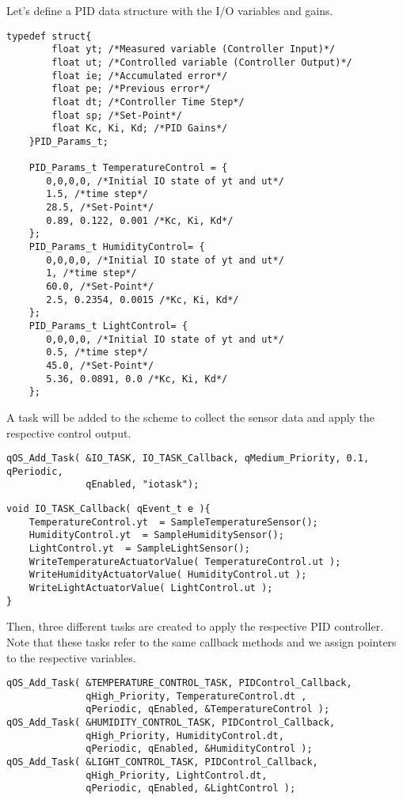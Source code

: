 Let's define a PID data structure with the I/O variables and gains. \\
 
\begin{lstlisting}[style=CStyle]
   typedef struct{
        float yt; /*Measured variable (Controller Input)*/
        float ut; /*Controlled variable (Controller Output)*/
        float ie; /*Accumulated error*/
        float pe; /*Previous error*/
        float dt; /*Controller Time Step*/
        float sp; /*Set-Point*/
        float Kc, Ki, Kd; /*PID Gains*/ 
    }PID_Params_t;
    
    PID_Params_t TemperatureControl = {
       0,0,0,0, /*Initial IO state of yt and ut*/
       1.5, /*time step*/
       28.5, /*Set-Point*/
       0.89, 0.122, 0.001 /*Kc, Ki, Kd*/
    };
    PID_Params_t HumidityControl= {
       0,0,0,0, /*Initial IO state of yt and ut*/
       1, /*time step*/
       60.0, /*Set-Point*/
       2.5, 0.2354, 0.0015 /*Kc, Ki, Kd*/
    };
    PID_Params_t LightControl= {
       0,0,0,0, /*Initial IO state of yt and ut*/
       0.5, /*time step*/
       45.0, /*Set-Point*/
       5.36, 0.0891, 0.0 /*Kc, Ki, Kd*/
    };
\end{lstlisting}

A task will be added to the scheme to collect the sensor data and apply the respective control output. \\

\begin{lstlisting}[style=CStyle]
qOS_Add_Task( &IO_TASK, IO_TASK_Callback, qMedium_Priority, 0.1, qPeriodic, 
              qEnabled, "iotask");
\end{lstlisting}

\begin{lstlisting}[style=CStyle]
void IO_TASK_Callback( qEvent_t e ){
    TemperatureControl.yt  = SampleTemperatureSensor();
    HumidityControl.yt  = SampleHumiditySensor();
    LightControl.yt  = SampleLightSensor();
    WriteTemperatureActuatorValue( TemperatureControl.ut );
    WriteHumidityActuatorValue( HumidityControl.ut );
    WriteLightActuatorValue( LightControl.ut ); 
}
\end{lstlisting}

Then, three different tasks are created to apply the respective PID controller. Note that these tasks refer to the same callback methods and we assign pointers to the respective variables. \\

\begin{lstlisting}[style=CStyle]
qOS_Add_Task( &TEMPERATURE_CONTROL_TASK, PIDControl_Callback,
              qHigh_Priority, TemperatureControl.dt , 
              qPeriodic, qEnabled, &TemperatureControl );
qOS_Add_Task( &HUMIDITY_CONTROL_TASK, PIDControl_Callback, 
              qHigh_Priority, HumidityControl.dt, 
              qPeriodic, qEnabled, &HumidityControl );
qOS_Add_Task( &LIGHT_CONTROL_TASK, PIDControl_Callback, 
              qHigh_Priority, LightControl.dt, 
              qPeriodic, qEnabled, &LightControl );
\end{lstlisting}

